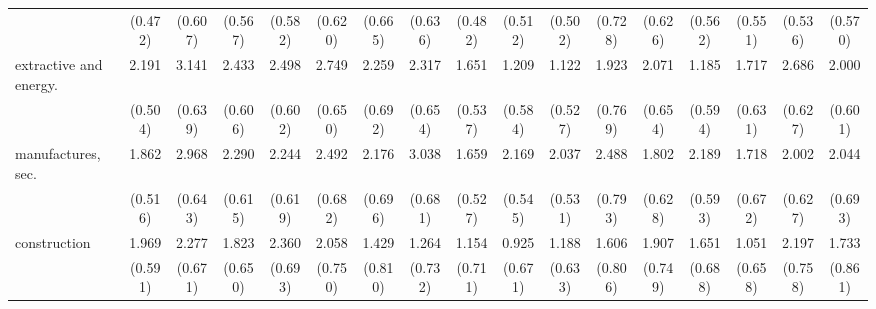 {\begin{tabular}{l*{16}{c}}
                    &     (0.472)         &     (0.607)         &     (0.567)         &     (0.582)         &     (0.620)         &     (0.665)         &     (0.636)         &     (0.482)         &     (0.512)         &     (0.502)         &     (0.728)         &     (0.626)         &     (0.562)         &     (0.551)         &     (0.536)         &     (0.570)         \\
[1em]
extractive and energy.&       2.191\sym{***}&       3.141\sym{***}&       2.433\sym{***}&       2.498\sym{***}&       2.749\sym{***}&       2.259\sym{**} &       2.317\sym{***}&       1.651\sym{**} &       1.209\sym{*}  &       1.122\sym{*}  &       1.923\sym{*}  &       2.071\sym{**} &       1.185\sym{*}  &       1.717\sym{**} &       2.686\sym{***}&       2.000\sym{***}\\
                    &     (0.504)         &     (0.639)         &     (0.606)         &     (0.602)         &     (0.650)         &     (0.692)         &     (0.654)         &     (0.537)         &     (0.584)         &     (0.527)         &     (0.769)         &     (0.654)         &     (0.594)         &     (0.631)         &     (0.627)         &     (0.601)         \\
[1em]
manufactures, sec.  &       1.862\sym{***}&       2.968\sym{***}&       2.290\sym{***}&       2.244\sym{***}&       2.492\sym{***}&       2.176\sym{**} &       3.038\sym{***}&       1.659\sym{**} &       2.169\sym{***}&       2.037\sym{***}&       2.488\sym{**} &       1.802\sym{**} &       2.189\sym{***}&       1.718\sym{*}  &       2.002\sym{**} &       2.044\sym{**} \\
                    &     (0.516)         &     (0.643)         &     (0.615)         &     (0.619)         &     (0.682)         &     (0.696)         &     (0.681)         &     (0.527)         &     (0.545)         &     (0.531)         &     (0.793)         &     (0.628)         &     (0.593)         &     (0.672)         &     (0.627)         &     (0.693)         \\
[1em]
construction        &       1.969\sym{***}&       2.277\sym{***}&       1.823\sym{**} &       2.360\sym{***}&       2.058\sym{**} &       1.429         &       1.264         &       1.154         &       0.925         &       1.188         &       1.606\sym{*}  &       1.907\sym{*}  &       1.651\sym{*}  &       1.051         &       2.197\sym{**} &       1.733\sym{*}  \\
                    &     (0.591)         &     (0.671)         &     (0.650)         &     (0.693)         &     (0.750)         &     (0.810)         &     (0.732)         &     (0.711)         &     (0.671)         &     (0.633)         &     (0.806)         &     (0.749)         &     (0.688)         &     (0.658)         &     (0.758)         &     (0.861)         \\

\end{tabular}}
